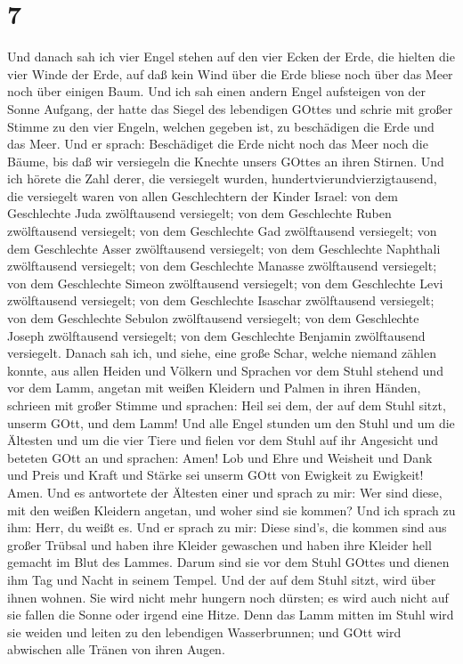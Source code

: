 \hypertarget{section-5}{%
\section{7}\label{section-5}}

 Und danach sah ich vier Engel stehen auf den vier Ecken der
Erde, die hielten die vier Winde der Erde, auf daß kein Wind über die
Erde bliese noch über das Meer noch über einigen Baum.  Und
ich sah einen andern Engel aufsteigen von der Sonne Aufgang, der hatte
das Siegel des lebendigen GOttes und schrie mit großer Stimme zu den
vier Engeln, welchen gegeben ist, zu beschädigen die Erde und das Meer.
 Und er sprach: Beschädiget die Erde nicht noch das Meer
noch die Bäume, bis daß wir versiegeln die Knechte unsers GOttes an
ihren Stirnen.  Und ich hörete die Zahl derer, die
versiegelt wurden, hundertvierundvierzigtausend, die versiegelt waren
von allen Geschlechtern der Kinder Israel:  von dem
Geschlechte Juda zwölftausend versiegelt; von dem Geschlechte Ruben
zwölftausend versiegelt; von dem Geschlechte Gad zwölftausend
versiegelt;  von dem Geschlechte Asser zwölftausend
versiegelt; von dem Geschlechte Naphthali zwölftausend versiegelt; von
dem Geschlechte Manasse zwölftausend versiegelt;  von dem
Geschlechte Simeon zwölftausend versiegelt; von dem Geschlechte Levi
zwölftausend versiegelt; von dem Geschlechte Isaschar zwölftausend
versiegelt;  von dem Geschlechte Sebulon zwölftausend
versiegelt; von dem Geschlechte Joseph zwölftausend versiegelt; von dem
Geschlechte Benjamin zwölftausend versiegelt.  Danach sah
ich, und siehe, eine große Schar, welche niemand zählen konnte, aus
allen Heiden und Völkern und Sprachen vor dem Stuhl stehend und vor dem
Lamm, angetan mit weißen Kleidern und Palmen in ihren Händen,
 schrieen mit großer Stimme und sprachen: Heil sei dem, der
auf dem Stuhl sitzt, unserm GOtt, und dem Lamm!  Und alle
Engel stunden um den Stuhl und um die Ältesten und um die vier Tiere und
fielen vor dem Stuhl auf ihr Angesicht und beteten GOtt an 
und sprachen: Amen! Lob und Ehre und Weisheit und Dank und Preis und
Kraft und Stärke sei unserm GOtt von Ewigkeit zu Ewigkeit! Amen.
 Und es antwortete der Ältesten einer und sprach zu mir:
Wer sind diese, mit den weißen Kleidern angetan, und woher sind sie
kommen?  Und ich sprach zu ihm: Herr, du weißt es. Und er
sprach zu mir: Diese sind's, die kommen sind aus großer Trübsal und
haben ihre Kleider gewaschen und haben ihre Kleider hell gemacht im Blut
des Lammes.  Darum sind sie vor dem Stuhl GOttes und dienen
ihm Tag und Nacht in seinem Tempel. Und der auf dem Stuhl sitzt, wird
über ihnen wohnen.  Sie wird nicht mehr hungern noch
dürsten; es wird auch nicht auf sie fallen die Sonne oder irgend eine
Hitze.  Denn das Lamm mitten im Stuhl wird sie weiden und
leiten zu den lebendigen Wasserbrunnen; und GOtt wird abwischen alle
Tränen von ihren Augen.

